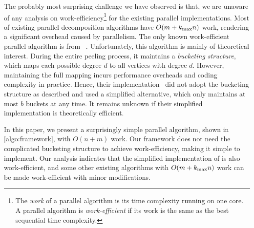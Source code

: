 The probably most surprising challenge we have observed is that, we are unaware of any analysis on work-efficiency\footnote{The \emph{work} of a parallel algorithm is its time complexity running on one core. A parallel algorithm is \emph{work-efficient} if its work is the same as the best sequential time complexity.} for the existing parallel implementations.
Most of existing parallel \kcore{} decomposition algorithms have $O(m+{k_{\max}} n)$ work, 
rendering a significant overhead caused by parallelism. 
The only known work-efficient parallel \kcore{} algorithm is from \Julienne~\cite{dhulipala2017}.
Unfortunately, this algorithm is mainly of theoretical interest. 
During the entire peeling process, it maintains a \emph{bucketing structure}, 
which maps each possible degree $d$ to all vertices with degree $d$.  
However, maintaining the full mapping incurs
performance overheads and coding complexity in practice. 
Hence, their implementation~\cite{dhulipala2017} did not adopt the bucketing structure as described 
and used a simplified alternative, which only maintains at most $b$ buckets at any time. 
It remains unknown if their simplified implementation is theoretically efficient. 


In this paper, we present a surprisingly simple parallel \kcore algorithm, shown in \cref{algo:framework}, with $O(n+m)$ work. 
Our framework does not need the complicated bucketing structure to achieve work-efficiency, making it simple to implement. 
Our analysis indicates that the simplified implementation of \Julienne{} is also work-efficient, 
and some other existing algorithms with $O(m+{k_{\max}} n)$ work can be made work-efficient with minor modifications. 

